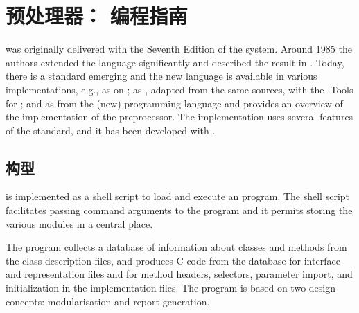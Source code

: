 

\chapter{ 预处理器： 编程指南}
\label{apd:Preprocessor}
 was originally delivered with the Seventh Edition of the
 system. Around 1985 the authors extended the language
significantly and described the result in \cite{AWK88}. Today, there is a
 standard emerging and the new language is available in various
implementations, e.g., as  on ; as ,
adapted from the same sources, with the -Tools for ;
and as  from the (new)  programming language and
provides an overview of the implementation of the  preprocessor.
The implementation uses several features of the  standard, and
it has been developed with .

\section{构型}%
 is implemented as a shell script to load and execute an
 program. The shell script facilitates passing 
command arguments to the  program and it permits storing the
various modules in a central place.

The  program collects a database of information about classes and
methods from the class description files, and produces C code from the
database for interface and representation files and for method headers,
selectors, parameter import, and initialization in the implementation files.
The  program is based on two design concepts: modularisation and
report generation.

